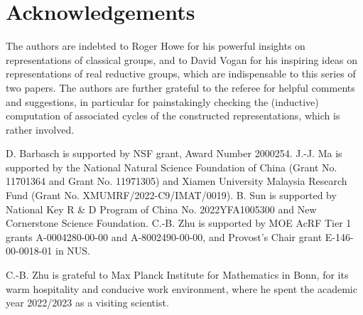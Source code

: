 \documentclass[11pt,a4paper]{amsart}
\numberwithin{equation}{section}
\theoremstyle{remark}
\begin{document}
\section*{Acknowledgements}

The authors are indebted to Roger Howe for his powerful insights on representations of classical groups, and to David Vogan for his inspiring ideas on representations of real reductive groups, which are indispensable to this series of two papers.  The authors are further grateful to the referee for helpful comments and suggestions, in particular for painstakingly checking the (inductive) computation of associated cycles of the constructed representations, which is rather involved.

D. Barbasch is supported by NSF grant, Award Number 2000254. J.-J. Ma is supported by the National Natural Science Foundation of China (Grant No. 11701364 and Grant No. 11971305) and  Xiamen University
Malaysia Research Fund (Grant No. XMUMRF/2022-C9/IMAT/0019).
B. Sun is supported by  National Key R \& D Program of China No. 2022YFA1005300  and New Cornerstone Science Foundation.  C.-B. Zhu is supported by MOE AcRF Tier 1 grants A-0004280-00-00 and A-8002490-00-00, and Provost’s Chair grant E-146-00-0018-01 in NUS.

C.-B. Zhu is grateful to Max Planck Institute for Mathematics in Bonn, for its warm hospitality and conducive work environment, where he spent the academic year 2022/2023 as a visiting scientist.
\end{document}
